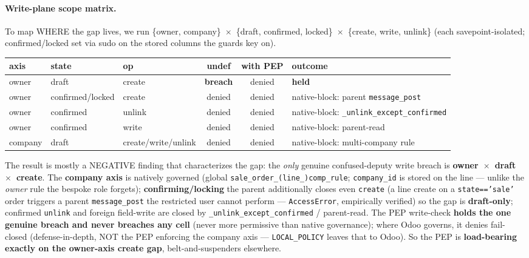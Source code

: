 \documentclass[11pt,a4paper]{article}
\newcommand{\code}[1]{\texttt{#1}}
\begin{document}
\paragraph{Write-plane scope matrix.} To map WHERE the gap lives, we run \{owner, company\}~$\times$~\{draft,
confirmed, locked\}~$\times$~\{create, write, unlink\} (each savepoint-isolated; confirmed/locked set via sudo on
the stored columns the guards key on).

\begin{center}\small
\begin{tabular}{@{}lllccl@{}}
\toprule
axis & state & op & undef & with PEP & outcome \\
\midrule
owner & draft & create & \textbf{breach} & denied & \textbf{held} \\
owner & confirmed/locked & create & denied & denied & native-block: parent \code{message\_post} \\
owner & confirmed & unlink & denied & denied & native-block: \code{\_unlink\_except\_confirmed} \\
owner & confirmed & write & denied & denied & native-block: parent-read \\
company & draft & create/write/unlink & denied & denied & native-block: multi-company rule \\
\bottomrule
\end{tabular}
\end{center}

The result is mostly a NEGATIVE finding that characterizes the gap: the \emph{only} genuine confused-deputy write
breach is \textbf{owner~$\times$~draft~$\times$~create}. The \textbf{company axis} is natively governed (global
\code{sale\_order\_(line\_)comp\_rule}; \code{company\_id} is stored on the line --- unlike the \emph{owner} rule the
bespoke role forgets); \textbf{confirming/locking} the parent additionally closes even \code{create} (a line create
on a \code{state=='sale'} order triggers a parent \code{message\_post} the restricted user cannot perform ---
\code{AccessError}, empirically verified) so the gap is \textbf{draft-only}; confirmed \code{unlink} and foreign
field-write are closed by \code{\_unlink\_except\_confirmed} / parent-read. The PEP write-check \textbf{holds the one
genuine breach and never breaches any cell} (never more permissive than native governance); where Odoo governs, it
denies fail-closed (defense-in-depth, NOT the PEP enforcing the company axis --- \code{LOCAL\_POLICY} leaves that to
Odoo). So the PEP is \textbf{load-bearing exactly on the owner-axis create gap}, belt-and-suspenders elsewhere.
\end{document}
